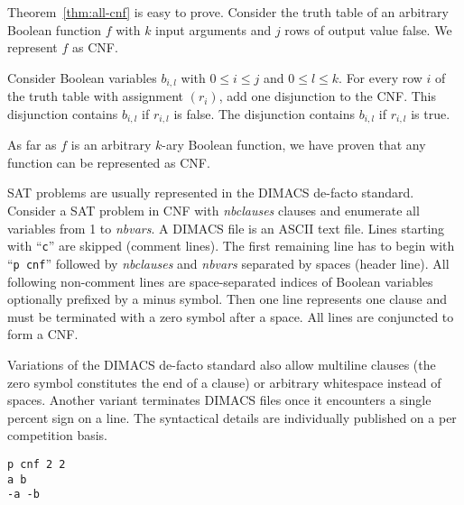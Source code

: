 Theorem~\ref{thm:all-cnf} is easy to prove.
%
Consider the truth table of an arbitrary Boolean function $f$ with $k$ input arguments
and $j$ rows of output value false. We represent $f$ as CNF.

Consider Boolean variables $b_{i,l}$ with $0 \leq i \leq j$ and $0 \leq l \leq k$.
For every row $i$ of the truth table with assignment $(r_i)$, add one disjunction to the CNF.
This disjunction contains $b_{i,l}$ if $r_{i,l}$ is false.
The disjunction contains $b_{i,l}$ if $r_{i,l}$ is true.

As far as $f$ is an arbitrary $k$-ary Boolean function, we have proven that
any function can be represented as CNF.

SAT problems are usually represented in the DIMACS de-facto standard.
Consider a SAT problem in CNF with \emph{nbclauses} clauses and
enumerate all variables from 1 to \emph{nbvars}. A DIMACS file is an ASCII text
file. Lines starting with \enquote{\texttt{c}} are skipped (comment lines).
The first remaining line has to begin with \enquote{\texttt{p cnf}} followed by
\emph{nbclauses} and \emph{nbvars} separated by spaces (header line).
All following non-comment lines are space-separated indices of Boolean variables
optionally prefixed by a minus symbol. Then one line represents one clause and
must be terminated with a zero symbol after a space. All lines are conjuncted
to form a CNF.

Variations of the DIMACS de-facto standard also allow multiline clauses (the
zero symbol constitutes the end of a clause) or arbitrary whitespace instead of
spaces. Another variant terminates DIMACS files once it encounters a single
percent sign on a line. The syntactical details are individually published
on a per competition basis.

\renewcommand{\lstlistingname}{Listing}  %
\begin{lstlisting}[caption={Display~\ref{eq:xor} represented in DIMACS format}]
p cnf 2 2
a b
-a -b
\end{lstlisting}

